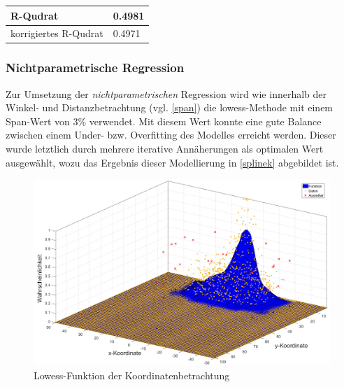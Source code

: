 \tablehead{}
\tabletail{}
\tablelasttail{}
\begin{center}%
\begin{supertabular}{ | P{6cm} | P{3cm}  |}
\textsf{R-Qudrat} 	& 0.4981	\\
\hline
\textsf{korrigiertes R-Qudrat} 	&  0.4971	\\
\hline
\end{supertabular}
\end{center}

\subsubsection{Nichtparametrische Regression}

Zur Umsetzung der \textit{nichtparametrischen} Regression wird wie innerhalb der Winkel- und Distanzbetrachtung (vgl. \vref{span}) die \gls{lowess}-Methode mit einem Span-Wert von \textsf{3\%} verwendet. Mit diesem Wert konnte eine gute Balance zwischen einem Under- bzw. Overfitting des Modelles erreicht werden. Dieser wurde letztlich durch mehrere iterative Annäherungen als optimalen Wert ausgewählt, wozu\enlargethispage{2\baselineskip} das Ergebnis dieser Modellierung in \vref{splinek} abgebildet ist.

\begin{figure}[H]
\centering
\includegraphics[scale=0.34]{se-wa-jpg/splinek}
\caption{Lowess-Funktion der Koordinatenbetrachtung}
\label{splinek}
\end{figure}

